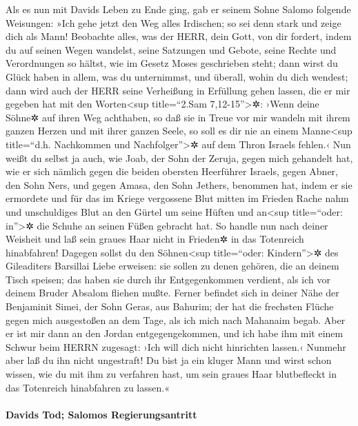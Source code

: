 Als es nun mit Davids Leben zu Ende ging, gab er seinem
Sohne Salomo folgende Weisungen: »Ich gehe jetzt den Weg
alles Irdischen; so sei denn stark und zeige dich als Mann!
Beobachte alles, was der HERR, dein Gott, von dir fordert,
indem du auf seinen Wegen wandelst, seine Satzungen und Gebote, seine
Rechte und Verordnungen so hältst, wie im Gesetz Moses geschrieben
steht; dann wirst du Glück haben in allem, was du unternimmst, und
überall, wohin du dich wendest; dann wird auch der HERR
seine Verheißung in Erfüllung gehen lassen, die er mir gegeben hat mit
den Worten\textless sup title=``2.Sam 7,12-15''\textgreater✲: ›Wenn
deine Söhne✲ auf ihren Weg achthaben, so daß sie in Treue vor mir
wandeln mit ihrem ganzen Herzen und mit ihrer ganzen Seele, so soll es
dir nie an einem Manne\textless sup title=``d.h. Nachkommen und
Nachfolger''\textgreater✲ auf dem Thron Israels fehlen.‹
Nun weißt du selbst ja auch, wie Joab, der Sohn der
Zeruja, gegen mich gehandelt hat, wie er sich nämlich gegen die beiden
obersten Heerführer Israels, gegen Abner, den Sohn Ners, und gegen
Amasa, den Sohn Jethers, benommen hat, indem er sie ermordete und für
das im Kriege vergossene Blut mitten im Frieden Rache nahm und
unschuldiges Blut an den Gürtel um seine Hüften und an\textless sup
title=``oder: in''\textgreater✲ die Schuhe an seinen Füßen gebracht hat.
So handle nun nach deiner Weisheit und laß sein graues
Haar nicht in Frieden✲ in das Totenreich hinabfahren!
Dagegen sollst du den Söhnen\textless sup title=``oder:
Kindern''\textgreater✲ des Gileaditers Barsillai Liebe erweisen: sie
sollen zu denen gehören, die an deinem Tisch speisen; das haben sie
durch ihr Entgegenkommen verdient, als ich vor deinem Bruder Absalom
fliehen mußte. Ferner befindet sich in deiner Nähe der
Benjaminit Simei, der Sohn Geras, aus Bahurim; der hat die frechsten
Flüche gegen mich ausgestoßen an dem Tage, als ich mich nach Mahanaim
begab. Aber er ist mir dann an den Jordan entgegengekommen, und ich habe
ihm mit einem Schwur beim HERRN zugesagt: ›Ich will dich nicht
hinrichten lassen.‹ Nunmehr aber laß du ihn nicht
ungestraft! Du bist ja ein kluger Mann und wirst schon wissen, wie du
mit ihm zu verfahren hast, um sein graues Haar blutbefleckt in das
Totenreich hinabfahren zu lassen.«

\hypertarget{davids-tod-salomos-regierungsantritt}{%
\paragraph{Davids Tod; Salomos
Regierungsantritt}\label{davids-tod-salomos-regierungsantritt}}

